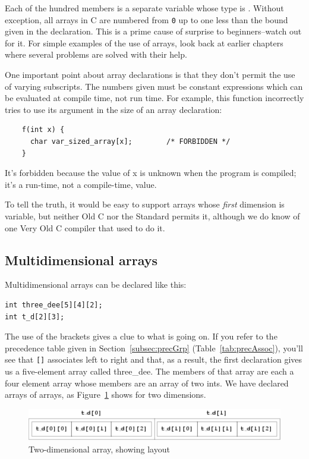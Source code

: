   Each of the hundred members is a separate variable whose type is
   \double. Without exception, all arrays in C are numbered from
   \texttt{0} up to one less than the bound given in the declaration.
   This is a prime cause of surprise to beginners--watch out for it. For
   simple examples of the use of arrays, look back at earlier chapters where
   several problems are solved with their help.


  One important point about array declarations is that they don't permit
   the use of varying subscripts. The numbers given must be constant
   expressions which can be evaluated at compile time, not run time. For
   example, this function incorrectly tries to use its argument in the size
   of an array declaration:


  \begin{Verbatim}
    f(int x) {
      char var_sized_array[x];        /* FORBIDDEN */
    }
  \end{Verbatim}

  It's forbidden because the value of x is unknown when the program is
   compiled; it's a run-time, not a compile-time, value.


  To tell the truth, it would be easy to support arrays whose
   \textit{first} dimension is variable, but neither Old C nor the Standard
   permits it, although we do know of one Very Old C compiler that used to
   do it.


  \subsection{Multidimensional arrays}
   

   Multidimensional arrays can be declared like this:


\begin{Verbatim}
int three_dee[5][4][2];
int t_d[2][3];
\end{Verbatim}

   The use of the brackets gives a clue to what is going on. If you refer
   to the precedence table
   given in Section~\ref{subsec:precGrp} (Table~\ref{tab:precAssoc}),
   you'll see that \texttt{[]} associates left to
    right and that, as a result, the first declaration gives us
    a five-element array called three\_dee. The members of that array are
    each a four element array whose members are an array of two ints. We
    have declared arrays of arrays, as Figure~\ref{fig:arr2} shows for two
    dimensions.


    \begin{figure}\centering
      \includegraphics[type=pdf,read=.pdf,ext=.pdf,scale=0.9]{figure/5.2_arr2}
      \caption*{Diagram showing a two dimensional array, with the 'outer' array            having two elements labelled 't\_d[0]' and 't\_d[1]', each with            three elements within it, labelled 't\_d[0][0]', etc.}
     \caption{\label{fig:arr2}Two-dimensional array, showing layout}
   \end{figure}




